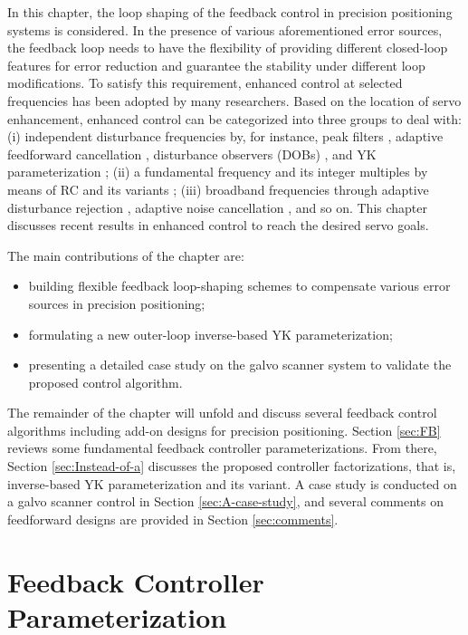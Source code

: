 \documentclass [11pt, proquest] {uwthesis}[2020/02/24]
\begin{document}
In this chapter, the loop shaping of the feedback control in precision
positioning systems is considered. In the presence of various aforementioned
error sources, the feedback loop needs to have the flexibility of
providing different closed-loop features for error reduction and guarantee
the stability under different loop modifications. To satisfy this
requirement, enhanced control at selected frequencies has been adopted
by many researchers. Based on the location of servo enhancement, enhanced
control can be categorized into three groups to deal with: (i) independent
disturbance frequencies by, for instance, peak filters \cite{li2011reset,sievers1992comparison},
adaptive feedforward cancellation \cite{Bodson1997,chen2016multirate},
disturbance observers (DOBs) \cite{XuChen_TCST2012,zheng2017design,chen2013selective},
and YK parameterization \cite{landau2005adaptive,landau2013benchmark,youla1976modern,kucera1975stability};
(ii) a fundamental frequency and its integer multiples by means of
RC and its variants \cite{chen2014new,steinbuch2007design};
(iii) broadband frequencies through adaptive disturbance rejection
\cite{de2013adaptive}, adaptive noise cancellation \cite{widrow1975adaptive},
and so on. This chapter discusses recent results in enhanced control
to reach the desired servo goals. 

The main contributions of the chapter are:
\begin{itemize}
\item building flexible feedback loop-shaping schemes to compensate various
error sources in precision positioning;
\item formulating a new outer-loop inverse-based YK parameterization;
\item presenting a detailed case study on the galvo scanner system to validate
the proposed control algorithm.
\end{itemize}
The remainder of the chapter will unfold and discuss several feedback
control algorithms including add-on designs for precision positioning.
Section \ref{sec:FB} reviews some fundamental feedback controller
parameterizations. From there, Section \ref{sec:Instead-of-a} discusses
the proposed controller factorizations, that is, inverse-based YK
parameterization and its variant. A case study is conducted on a galvo
scanner control in Section \ref{sec:A-case-study}, and several comments
on feedforward designs are provided in Section \ref{sec:comments}.

\section{Feedback Controller Parameterization}
\end{document}

